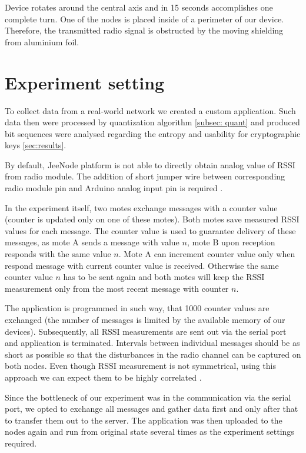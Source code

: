 \documentclass[
  print, %
  Table,   %
  nolof,     %
  nolot,     %
           oneside
]{fithesis3}
\begin{document}
  Device rotates around the central axis and in 15 seconds accomplishes one complete turn. One of the nodes is placed inside of a perimeter of our device. Therefore, the transmitted radio signal is obstructed by the moving shielding from aluminium foil.


  \section{Experiment setting}
   To collect data from a real-world network we created a custom application. Such data then were processed by quantization algorithm \ref{subsec: quant} and produced bit sequences were analysed regarding the entropy and usability for cryptographic keys \ref{sec:results}.

   By default, JeeNode platform is not able to directly obtain analog value of RSSI from radio module. The addition of short jumper wire between corresponding radio module pin and Arduino analog input pin is required \cite{RSSI_RF12B_mod}.

  In the experiment itself, two motes exchange messages with a counter value (counter is updated only on one of these motes). Both motes save measured RSSI values for each message. The counter value is used to guarantee delivery of these messages, as mote A sends a message with value $n$, mote B upon reception responds with the same value $n$. Mote A can increment counter value only when respond message with current counter value is received. Otherwise the same counter value $n$ has to be sent again and both motes will keep the RSSI measurement only from the most recent message with counter $n$.

  The application is programmed in such way, that 1000 counter values are exchanged (the number of messages is limited by the available memory of our devices). Subsequently, all RSSI measurements are sent out via the serial port and application is terminated. Intervals between individual messages should be as short as possible so that the disturbances in the radio channel can be captured on both nodes. Even though RSSI measurement is not symmetrical, using this approach we can expect them to be highly correlated \cite{Jana2009Rssi}.

Since the bottleneck of our experiment was in the communication via the serial port, we opted to exchange all messages and gather data first and only after that to transfer them out to the server. The application was then uploaded to the nodes again and run from original state several times as the experiment settings required.
\end{document}

